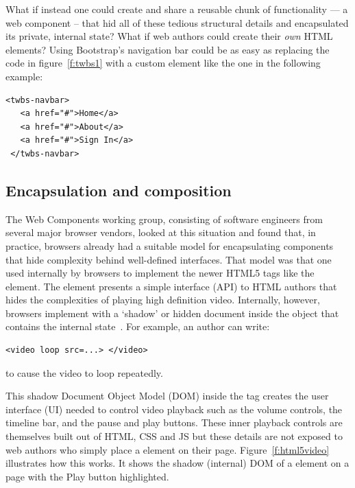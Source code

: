 What if instead one could create and share a reusable chunk of functionality --- a web component -- that hid all of these tedious structural details and encapsulated its private, internal state? 
What if web authors could create their \textit{own} HTML elements?  
Using Bootstrap's navigation bar could be as easy as replacing the code in figure~\ref{f:twbs1} with a custom element like the one in the following example:

% 

\begin{lstlisting}[language=HTML5,numbers=none,caption=
{Hypothetical Bootstrap nav bar custom element.},label=l:twbs2,captionpos=below]
 <twbs-navbar>
   <a href="#">Home</a>
   <a href="#">About</a>
   <a href="#">Sign In</a>
 </twbs-navbar>
\end{lstlisting}

\subsection{Encapsulation and composition}

The Web Components working group, consisting of software engineers from several major browser vendors, 
looked at this situation and found that, in practice, browsers already had a suitable model for encapsulating components that hide complexity behind well-defined interfaces.
That model was that one used internally by browsers to implement the newer HTML5 tags like the \textbf{} element. 
The  element presents a simple interface (API) to HTML authors that hides the complexities of playing high definition video.
Internally, however, browsers implement  with a `shadow' or hidden document inside the object that contains the internal state~\cite{kitamura2014}. 
For example, an author can write:
\begin{lstlisting}[language=HTML5,numbers=none]
	<video loop src=...> </video>
\end{lstlisting}
to cause the video to loop repeatedly.

This shadow Document Object Model (DOM) inside the  tag creates the user interface (UI) needed to control video playback such as the volume controls, the timeline bar, and the pause and play buttons.
These inner playback controls are themselves built out of HTML, CSS and JS but these details are not exposed to web authors who simply place a  element on their page. 
Figure~\ref{f:html5video} illustrates how this works. It shows the shadow (internal) DOM of a  element on a page with the Play button  highlighted.

